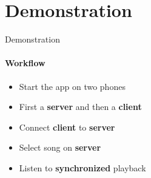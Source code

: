 \section{Demonstration}
\author{Mathias}
\begin{frame}{Demonstration}
    \framesubtitle{Workflow}
    \begin{itemize}
        \item Start the app on two phones
        \item First a \textbf{server} and then a \textbf{client}
        \item Connect \textbf{client} to \textbf{server}
        \item Select song on \textbf{server}
        \item Listen to \textbf{synchronized} playback
    \end{itemize}
\end{frame}
